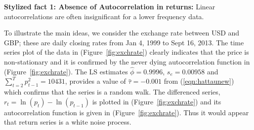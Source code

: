 \noindent\textbf{Stylized fact 1: Absence of Autocorrelation in returns:} Linear autocorrelations are often insignificant for a lower frequency data. 


To illustrate the main ideas, we consider the exchange rate between USD and GBP; these are daily closing rates from Jan 4, 1999 to Sept 16, 2013. The time series plot of the data in (Figure~\ref{fig:exchrate}) clearly indicates that the price is non-stationary and it is confirmed by the never dying autocorrelation function in (Figure~\ref{fig:exchrate}). The LS estimates $\hat{\phi}= 0.9996$, $s_e= 0.00958$ and $\sum_{t=2}^Tp_{t-1}^2= 10431$, provides a value of $\hat{\tau} = -0.001$ from (\ref{eqn:hattaunew}) which confirms that the series is a random walk. The differenced series, $r_t = \ln{(p_t)} - \ln{(p_{t-1})}$ is plotted in (Figure~\ref{fig:exchrate}) and its autocorrelation function is given in (Figure~\ref{fig:exchrate}). Thus it would appear that return series is a white noise process.


